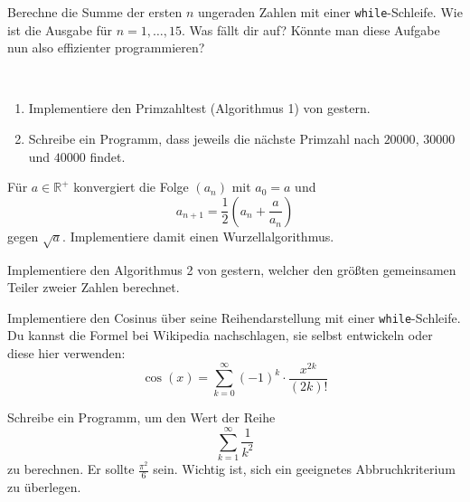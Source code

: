 \documentclass{uebungszettel}
\begin{document}
\begin{aufg}
Berechne die Summe der ersten $n$ ungeraden Zahlen mit einer \texttt{while}-Schleife. Wie ist die Ausgabe für $n = 1, \ldots ,15$. Was fällt dir auf? Könnte man diese Aufgabe nun also effizienter programmieren?
\end{aufg}

\begin{aufg}~
\begin{enumerate}
\item Implementiere den Primzahltest (Algorithmus 1) von gestern.
\item Schreibe ein Programm, dass jeweils die nächste Primzahl nach $20000$, $30000$ und $40000$ findet.
\end{enumerate}
\end{aufg}

\begin{aufg}
Für $a \in \mathbb{R}^+$ konvergiert die Folge $(a_n)$ mit $a_0 = a$ und
\[ a_{n+1} = \frac{1}{2}\left(a_n + \frac{a}{a_n}\right) \]
gegen $\sqrt{a}$. Implementiere damit einen Wurzellalgorithmus.
\end{aufg}

\begin{aufg}
Implementiere den Algorithmus 2 von gestern, welcher den größten gemeinsamen Teiler zweier Zahlen berechnet.
\end{aufg}

\begin{aufg}
Implementiere den Cosinus über seine Reihendarstellung mit einer \texttt{while}-Schleife. Du kannst die Formel bei Wikipedia nachschlagen, sie selbst entwickeln oder diese hier verwenden:
\[ \cos(x) = \sum_{k = 0}^{\infty}{(-1)^k \cdot \frac{x^{2k}}{(2k)!}} \]
\end{aufg}

\begin{aufg}
Schreibe ein Programm, um den Wert der Reihe
\[ \sum_{k = 1}^\infty \frac{1}{k^2} \]
zu berechnen. Er sollte $\frac{\pi^2}{6}$ sein. Wichtig ist, sich ein geeignetes Abbruchkriterium zu überlegen.
\end{aufg}
\end{document}
